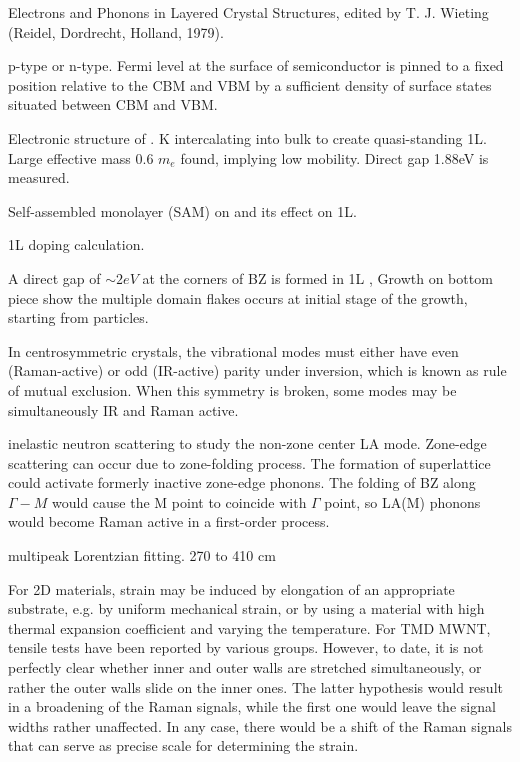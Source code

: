 Electrons and Phonons in Layered Crystal Structures, edited by T. J. Wieting (Reidel, Dordrecht, Holland, 1979).

 p-type or n-type.  Fermi level at the surface of semiconductor is pinned to a fixed position relative to the CBM and VBM by a sufficient density of surface states situated between CBM and VBM. \cite{Baglio1983}

Electronic structure of .\cite{Eknapakul2014} K intercalating into bulk to create quasi-standing 1L. Large effective mass 0.6 $m_e$ found, implying low mobility. Direct gap 1.88eV is measured.

Self-assembled monolayer (SAM) on  and its effect on  1L.\cite{Najmaei2014}

 1L doping calculation. \cite{Ma2011}



A direct gap of $\sim 2eV$ at the corners of BZ is formed in 1L , Growth on bottom piece show the multiple domain flakes occurs at initial stage of the growth, starting from  particles.


In centrosymmetric crystals, the vibrational modes must either have even (Raman-active) or odd (IR-active) parity under inversion, which is known as rule of mutual exclusion. When this symmetry is broken, some modes may be simultaneously IR and Raman active.

inelastic neutron scattering to study the non-zone center LA mode. Zone-edge scattering can occur due to zone-folding process. The formation of superlattice could activate formerly inactive zone-edge phonons. The folding of BZ along $\Gamma-M$ would cause the M point to coincide with $\Gamma$ point, so LA(M) phonons would become Raman active in a first-order process.

multipeak Lorentzian fitting. 270 to 410 cm

For 2D materials, strain may be induced by elongation of an appropriate substrate, e.g. by uniform mechanical strain, or by using a material with high thermal expansion coefficient and varying the temperature. For TMD MWNT, tensile tests have been reported by various groups. However, to date, it is not perfectly clear whether inner and outer walls are stretched simultaneously, or rather the outer walls slide on the inner ones. The latter hypothesis would result in a broadening of the Raman signals, while the first one would leave the signal widths rather unaffected. In any case, there would be a shift of the Raman signals that can serve as precise scale for determining the strain.

